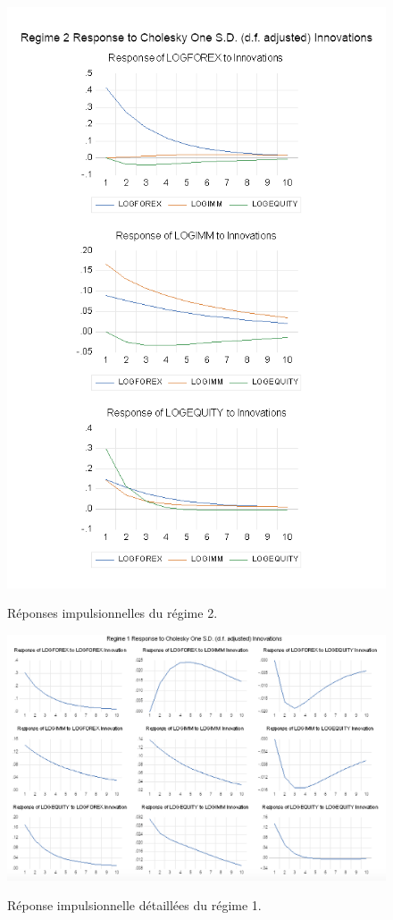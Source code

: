 \begin{figure}[H]
    \centering
    \caption{Réponses impulsionnelles du régime 2.}
    \includegraphics[scale=1]{annexes/regime_2_impulsereponse.png}
    \label{fig:impulse_reponse_r2}
\end{figure}

\begin{figure}[H]
    \centering
    \caption{Réponse impulsionnelle détaillées du régime 1.}
    \includegraphics[scale=0.65]{annexes/regime1_mutiple_reponses.png}
    \label{fig:msih_resids}
\end{figure}

